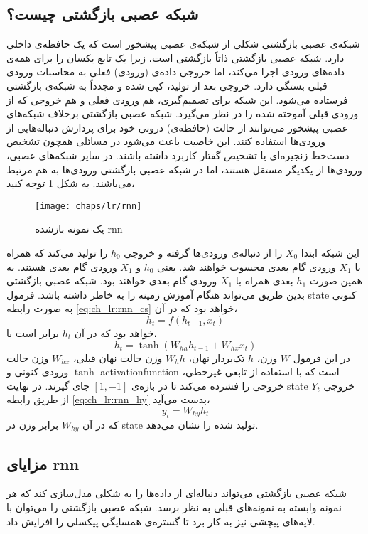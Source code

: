 \subsection{شبکه عصبی بازگشتی چیست؟}
 شبکه‌ی عصبی بازگشتی شکلی از شبکه‌ی عصبی پیشخور است که یک حافظه‌ی داخلی دارد. شبکه عصبی بازگشتی ذاتاً بازگشتی است، زیرا یک تابع یکسان را برای همه‌ی داده‌های ورودی اجرا می‌کند، اما خروجی داده‌ی (ورودی) فعلی به محاسبات ورودی قبلی بستگی دارد. خروجی بعد از تولید، کپی شده و مجدداً به شبکه‌ی بازگشتی فرستاده می‌شود. این شبکه برای تصمیم‌گیری، هم ورودی فعلی و هم خروجی که از ورودی قبلی آموخته شده را در نظر می‌گیرد.
 شبکه عصبی بازگشتی برخلاف شبکه‌های عصبی پیشخور می‌توانند از حالت (حافظه‌ی) درونی خود برای پردازش دنباله‌هایی از ورودی‌ها استفاده کنند. این خاصیت باعث می‌شود در مسائلی همچون تشخیص دست‌خط زنجیره‌ای یا تشخیص گفتار کاربرد داشته باشند. در سایر شبکه‌های عصبی، ورودی‌ها از یکدیگر مستقل هستند، اما در شبکه عصبی بازگشتی ورودی‌ها به هم مرتبط می‌باشند. به شکل \ref{fig:ch_lr:rnn} توجه کنید،
 \begin{figure}[!ht]
 	\centerline{\texttt{[image: chaps/lr/rnn]}}
 	\caption{
 		یک نمونه بازشده \gls{rnn}
 	}
 	\label{fig:ch_lr:rnn}
 \end{figure}
 این شبکه ابتدا $X_0$ را از دنباله‌ی ورودی‌ها گرفته و خروجی $h_0$ را تولید می‌کند که همراه با $X_1$ ورودی گام بعدی محسوب خواهند شد. یعنی $h_0$ و $X_1$ ورودی گام بعدی هستند. به همین صورت $h_1$ بعدی همراه با $X_1$ ورودی گام بعدی خواهند بود. شبکه عصبی بازگشتی بدین طریق می‌تواند هنگام آموزش زمینه را به خاطر داشته باشد.
 فرمول \gls{state} کنونی به صورت رابطه \ref{eq:ch_lr:rnn_cs} خواهد بود که در آن،
 \begin{equation}
 	h_t = f(h_{t-1}, x_t)
 	\label{eq:ch_lr:rnn_cs}
 \end{equation}
 خواهد بود که در آن $h_t$ برابر است با،
 \begin{equation}
 	h_t = \tanh(W_{hh}h_{t-1} + W_{hx}x_t)
 	\label{eq:ch_lr:rnn_ht}
 \end{equation}
 در این فرمول $W$ وزن، $h$ تک‌بردار نهان، $W_hh$ وزن حالت نهان قبلی، $W_{hx}$ وزن حالت ورودی کنونی و $\tanh$ \gls{activationfunction} است که با استفاده از تابعی غیرخطی، خروجی را فشرده می‌کند تا در بازه‌ی $[1, -1]$ جای گیرند. در نهایت \gls{state} خروجی $Y_t$ از طریق رابطه \ref{eq:ch_lr:rnn_hy} بدست می‌آید،
 \begin{equation}
 	y_t = W_{hy}h_t
 	\label{eq:ch_lr:rnn_hy}
 \end{equation}
 که در آن $W_{hy}$ برابر وزن در \gls{state} تولید شده را نشان می‌دهد.
 
 \subsection{مزایای \gls{rnn}}
 شبکه عصبی بازگشتی می‌تواند دنباله‌ای از داده‌ها را به شکلی مدل‌سازی کند که هر نمونه وابسته به نمونه‌های قبلی به نظر برسد. شبکه عصبی بازگشتی را می‌توان با لایه‌های پیچشی نیز به کار برد تا گستره‌ی همسایگی پیکسلی را افزایش داد.
 
